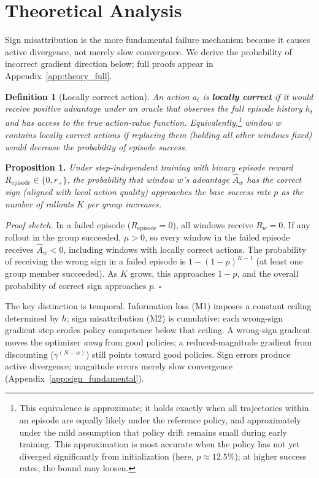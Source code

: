 \section{Theoretical Analysis}
\label{sec:theory}

Sign misattribution is the more fundamental failure mechanism because it causes active divergence, not merely slow convergence. We derive the probability of incorrect gradient direction below; full proofs appear in Appendix~\ref{app:theory_full}.

\textbf{Definition 1} (Locally correct action). \textit{An action $a_t$ is \textbf{locally correct} if it would receive positive advantage under an oracle that observes the full episode history $h_t$ and has access to the true action-value function. Equivalently,\footnote{This equivalence is approximate; it holds exactly when all trajectories within an episode are equally likely under the reference policy, and approximately under the mild assumption that policy drift remains small during early training. This approximation is most accurate when the policy has not yet diverged significantly from initialization (here, $p \approx 12.5\%$); at higher success rates, the bound may loosen.} window $w$ contains locally correct actions if replacing them (holding all other windows fixed) would decrease the probability of episode success.}

\textbf{Proposition 1.} \textit{Under step-independent training with binary episode reward $R_{\text{episode}} \in \{0, r_+\}$, the probability that window $w$'s advantage $\hat{A}_w$ has the correct sign (aligned with local action quality) approaches the base success rate $p$ as the number of rollouts $K$ per group increases.}

\textit{Proof sketch.} In a failed episode ($R_{\text{episode}} = 0$), all windows receive $R_w = 0$. If any rollout in the group succeeded, $\mu > 0$, so every window in the failed episode receives $\hat{A}_w < 0$, including windows with locally correct actions. The probability of receiving the wrong sign in a failed episode is $1 - (1-p)^{K-1}$ (at least one group member succeeded). As $K$ grows, this approaches $1-p$, and the overall probability of correct sign approaches $p$. \hfill$\square$

The key distinction is temporal. Information loss (M1) imposes a constant ceiling determined by $h$; sign misattribution (M2) is cumulative: each wrong-sign gradient step erodes policy competence below that ceiling. A wrong-sign gradient moves the optimizer \textit{away} from good policies; a reduced-magnitude gradient from discounting ($\gamma^{(N-w)}$) still points toward good policies. Sign errors produce active divergence; magnitude errors merely slow convergence (Appendix~\ref{app:sign_fundamental}).

